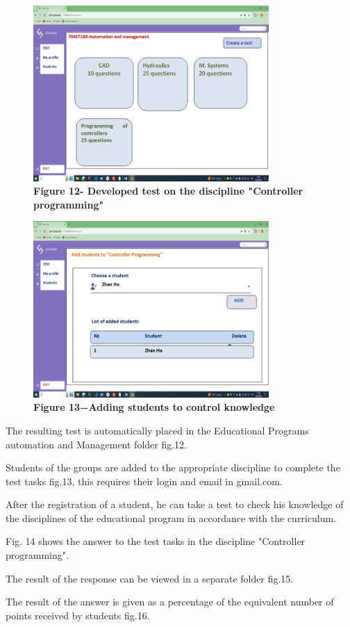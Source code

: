 \begin{figure}[H]
	\centering
	\includegraphics[height=0.4\textwidth, width=0.8\textwidth]{assets/137}
	\caption*{\bfseries Figure 12- Developed test on the discipline "Controller
	programming"}
\end{figure}



\begin{figure}[H]
	\centering
	\includegraphics[height=0.4\textwidth, width=0.8\textwidth]{assets/138}
	\caption*{\bfseries Figure 13−Adding students to control knowledge}
\end{figure}

\begin{multicols}{2}
The resulting test is automatically placed in the Educational Programs
automation and Management folder fig.12.

Students of the groups are added to the appropriate discipline to
complete the test tasks fig.13, this requires their login and email in
gmail.com.


After the registration of a student, he can take a test to check his
knowledge of the disciplines of the educational program in accordance
with the curriculum.

Fig. 14 shows the answer to the test tasks in the discipline "Controller
programming".


The result of the response can be viewed in a separate folder fig.15.

The result of the answer is given as a percentage of the equivalent
number of points received by students fig.16.
\end{multicols}


